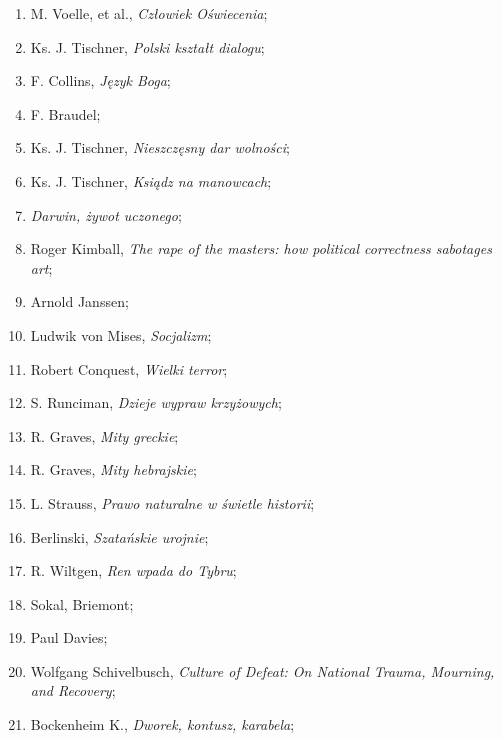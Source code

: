 \documentclass[a4paper,11pt]{article}
\begin{document}
\begin{enumerate}
\item M. Voelle, et al., \emph{Człowiek Oświecenia};

\item Ks. J. Tischner, \emph{Polski kształt dialogu};

\item F. Collins, \emph{Język Boga};

\item F. Braudel;

\item Ks. J. Tischner, \emph{Nieszczęsny dar wolności};

\item Ks. J. Tischner, \emph{Ksiądz na manowcach};

\item \emph{Darwin, żywot uczonego};

\item Roger Kimball, \emph{The rape of the masters: how political
    correctness sabotages art};

\item Arnold Janssen;

\item Ludwik von Mises, \emph{Socjalizm};

\item Robert Conquest, \emph{Wielki terror};

\item S. Runciman, \emph{Dzieje wypraw krzyżowych};

\item R. Graves, \emph{Mity greckie};

\item R. Graves, \emph{Mity hebrajskie};

\item L. Strauss, \emph{Prawo naturalne w świetle historii};

\item Berlinski, \emph{Szatańskie urojnie};

\item R. Wiltgen, \emph{Ren wpada do Tybru};

\item Sokal, Briemont;

\item Paul Davies;

\item Wolfgang Schivelbusch, \emph{Culture of Defeat: On National
    Trauma, Mourning, and Recovery};

\item Bockenheim K., \emph{Dworek, kontusz, karabela};


\end{enumerate}
\end{document}

